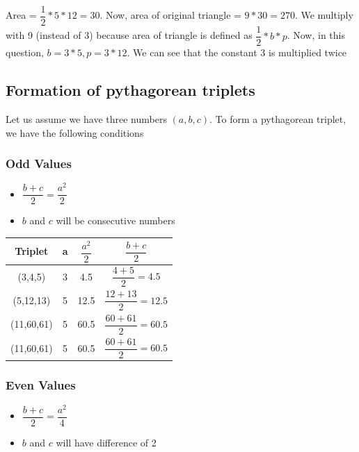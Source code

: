 Area = $\dfrac{1}{2} * 5 * 12 = 30$. Now, area of original triangle = $9 * 30 = 270$. We multiply with 9 (instead of 3) because area of triangle is defined as $\dfrac{1}{2} * b * p$. Now, in this question, $b = 3 * 5, p = 3 * 12$. We can see that the constant $3$ is multiplied twice

\subsection{Formation of pythagorean triplets}
Let us assume we have three numbers $(a,b,c)$. To form a pythagorean triplet, we have the following conditions

\subsubsection{Odd Values}
\begin{itemize}
    \item $\dfrac{b + c}{2} = \dfrac{a^2}{2}$
    \item $b$ and $c$ will be consecutive numbers
\end{itemize}

\begin{table}[h!]
    \centering
    \begin{tabular}{|| c | c | c | c ||}
        \hline
         \textbf{Triplet} & \textbf{a} & $\dfrac{a^2}{2}$ & $\dfrac{b + c}{2}$  \\
        \hline
         (3,4,5) & 3 & 4.5 & $\dfrac{4 + 5}{2} = 4.5 $ \\
        \hline
         (5,12,13) & 5 & 12.5 & $\dfrac{12 + 13}{2} = 12.5 $ \\
        \hline
         (11,60,61) & 5 & 60.5 & $\dfrac{60 + 61}{2} = 60.5 $ \\
        \hline
         (11,60,61) & 5 & 60.5 & $\dfrac{60 + 61}{2} = 60.5 $ \\
        \hline
    \end{tabular}
\end{table}

\subsubsection{Even Values}
\begin{itemize}
    \item $\dfrac{b + c}{2} = \dfrac{a^2}{4}$
    \item $b$ and $c$ will have difference of 2
\end{itemize}

